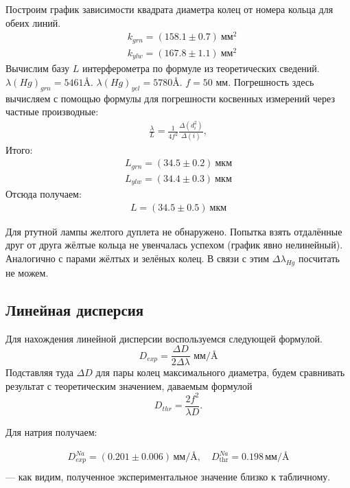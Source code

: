 \documentclass[a4paper,12pt]{article}
\theoremstyle{definition}
\begin{document}
\newpage
Построим график зависимости квадрата диаметра колец от номера кольца для обеих линий.
\begin{align*}
  &k_{grn} = (158.1 \pm 0.7)\ \text{мм}^{2} \\
  &k_{ylw} = (167.8 \pm 1.1)\ \text{мм}^{2}
\end{align*}
Вычислим базу $L$ интерферометра по формуле из теоретических сведений. $\lambda(Hg)_{grn} = 5461 \text{\AA}$. $\lambda(Hg)_{yel} = 5780 \text{\AA}$. $f = 50$ мм. Погрешность здесь вычисляем с помощью формулы для погрешности косвенных измерений
через частные производные:
\begin{align*}
   \frac{\lambda}{L} = \frac{1}{4f^2}\frac{\Delta(d^2_i)}{\Delta(i)},
\end{align*}
Итого: 
\begin{align*}
    L_{grn} = (34.5 \pm 0.2) \ \text{мкм} \\
    L_{ylw} = (34.4 \pm 0.3) \ \text{мкм}
\end{align*}
Отсюда получаем:
\begin{align*}
  L = (34.5 \pm 0.5) \ \text{мкм}
\end{align*}

Для ртутной лампы желтого дуплета не обнаружено. Попытка взять отдалённые друг от друга жёлтые кольца не увенчалась успехом (график явно нелинейный). 
Аналогично с парами жёлтых и зелёных колец. В связи с этим $\Delta \lambda_{Hg}$ посчитать не можем.

\subsection{Линейная дисперсия}
Для нахождения линейной дисперсии воспользуемся следующей формулой.
\begin{equation}
    D_{exp} = \frac{\Delta D}{2 \Delta \lambda} \text{ мм/}{\text{\AA}}
\end{equation}
Подставляя туда $\Delta D$ для пары колец максимального диаметра, будем сравнивать результат с теоретическим значением, даваемым формулой
\begin{equation}
    D_{thr} = \frac{2f^2}{\lambda D}.
\end{equation}

Для натрия получаем:

\begin{align*}
    D^{Na}_{exp} = (0.201 \pm 0.006)\, \text{мм/}{\text{\AA}}, \quad D^{Na}_\text{thr} = 0.198\, \text{мм/}{\text{\AA}} \\
\end{align*}
--- как видим, полученное экспериментальное значение близко к табличному.
\end{document}
